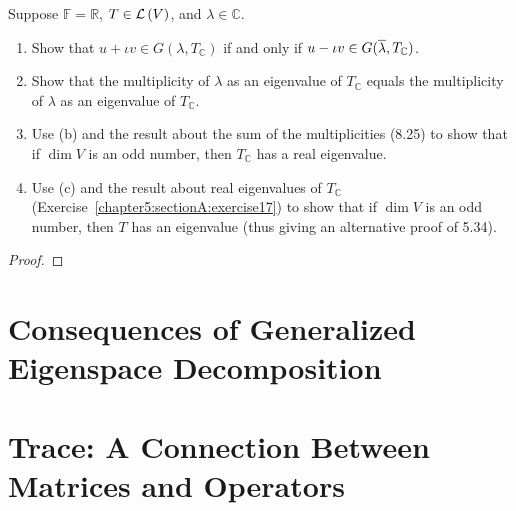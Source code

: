 \begin{exercise}\label{chapter8:sectionB:exercise23}
    Suppose $\mathbb{F} = \mathbb{R}$, $T\in\mathcal{L}\left({V}\right)$, and $\lambda\in\mathbb{C}$.
    \begin{enumerate}[label={(\alph*)}]
        \item Show that $u + \iota v\in G(\lambda, T_{\mathbb{C}})$ if and only if $u - \iota v\in G(\overline{\lambda}, T_{\mathbb{C}})$.
        \item Show that the multiplicity of $\lambda$ as an eigenvalue of $T_{\mathbb{C}}$ equals the multiplicity of $\lambda$ as an eigenvalue of $T_{\mathbb{C}}$.
        \item Use (b) and the result about the sum of the multiplicities (8.25) to show that if $\dim V$ is an odd number, then $T_{\mathbb{C}}$ has a real eigenvalue.
        \item Use (c) and the result about real eigenvalues of $T_{\mathbb{C}}$ (Exercise~\ref{chapter5:sectionA:exercise17}) to show that if $\dim V$ is an odd number, then $T$ has an eigenvalue (thus giving an alternative proof of 5.34).
    \end{enumerate}
\end{exercise}

\begin{proof}
\end{proof}
\newpage

\section{Consequences of Generalized Eigenspace Decomposition}

\section{Trace: A Connection Between Matrices and Operators}

